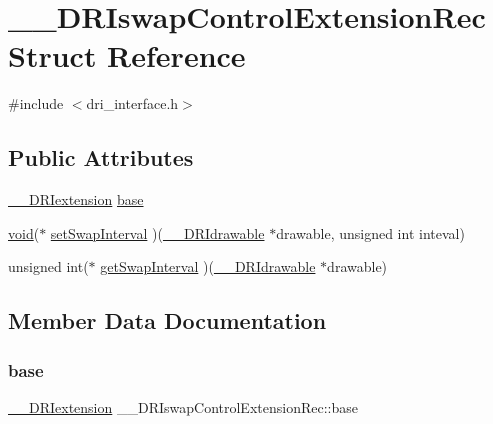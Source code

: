 \hypertarget{struct_____d_r_iswap_control_extension_rec}{}\section{\+\_\+\+\_\+\+D\+R\+Iswap\+Control\+Extension\+Rec Struct Reference}
\label{struct_____d_r_iswap_control_extension_rec}


{\ttfamily \#include $<$dri\+\_\+interface.\+h$>$}

\subsection*{Public Attributes}
\begin{DoxyCompactItemize}
\item 
\hyperlink{dri__interface_8h_a4e0a61c8ece00d2b2c6792a9a1b55385}{\+\_\+\+\_\+\+D\+R\+Iextension} \hyperlink{struct_____d_r_iswap_control_extension_rec_a63e0317da77ea34096da910ec41c8291}{base}
\item 
\hyperlink{_s_d_l__opengles2__gl2ext_8h_ae5d8fa23ad07c48bb609509eae494c95}{void}($\ast$ \hyperlink{struct_____d_r_iswap_control_extension_rec_ae66cec8b7d62db555d6209a237995e67}{set\+Swap\+Interval} )(\hyperlink{dri__interface_8h_a5bfb832a0a08208d95b3bbef439d2262}{\+\_\+\+\_\+\+D\+R\+Idrawable} $\ast$drawable, unsigned int inteval)
\item 
unsigned int($\ast$ \hyperlink{struct_____d_r_iswap_control_extension_rec_a94752c871b01da1383d6a3d68be7d764}{get\+Swap\+Interval} )(\hyperlink{dri__interface_8h_a5bfb832a0a08208d95b3bbef439d2262}{\+\_\+\+\_\+\+D\+R\+Idrawable} $\ast$drawable)
\end{DoxyCompactItemize}


\subsection{Member Data Documentation}
\mbox{\label{struct_____d_r_iswap_control_extension_rec_a63e0317da77ea34096da910ec41c8291}} 
\subsubsection{\texorpdfstring{base}{base}}
{\footnotesize\ttfamily \hyperlink{dri__interface_8h_a4e0a61c8ece00d2b2c6792a9a1b55385}{\+\_\+\+\_\+\+D\+R\+Iextension} \+\_\+\+\_\+\+D\+R\+Iswap\+Control\+Extension\+Rec\+::base}

